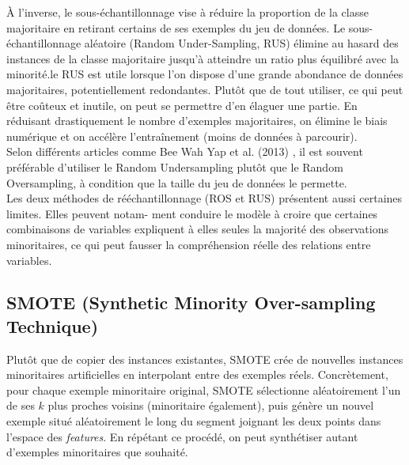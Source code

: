 \documentclass{article}
\begin{document}
À l’inverse, le sous-échantillonnage vise à réduire la proportion de la classe
majoritaire en retirant certains de ses exemples du jeu de données. Le sous-échantillonnage aléatoire
(Random Under-Sampling, RUS) élimine au hasard des instances de la classe majoritaire jusqu’à atteindre
un ratio plus équilibré avec la minorité.le RUS est utile lorsque l’on dispose d’une grande abondance de
données majoritaires, potentiellement redondantes. Plutôt que de tout utiliser, ce qui peut être
coûteux et inutile, on peut se permettre d’en élaguer une partie. En réduisant drastiquement le nombre
d’exemples majoritaires, on élimine le biais numérique et on accélère l’entraînement (moins de
données à parcourir).
\\

Selon différents articles comme Bee Wah Yap et al. (2013) \cite{MerwanC}, il est souvent préférable d’utiliser le Random Undersampling plutôt que le Random Oversampling, à condition que la taille du jeu de données le permette.
\\

Les deux méthodes de rééchantillonnage (ROS et RUS) présentent aussi certaines limites. Elles peuvent notam-
ment conduire le modèle à croire que certaines combinaisons de variables expliquent à
elles seules la majorité des observations minoritaires, ce qui peut fausser la compréhension
réelle des relations entre variables.

\subsection{SMOTE (Synthetic Minority Over-sampling Technique)}

Plutôt que de copier des instances existantes,
SMOTE crée de nouvelles instances minoritaires artificielles en interpolant entre des exemples réels. Concrètement, pour chaque exemple minoritaire original, SMOTE sélectionne aléatoirement l’un de ses
$k$ plus proches voisins (minoritaire également), puis génère un nouvel exemple situé aléatoirement le
long du segment joignant les deux points dans l’espace des \textit{features}. En répétant ce procédé, on
peut synthétiser autant d’exemples minoritaires que souhaité.
\\
\end{document}

